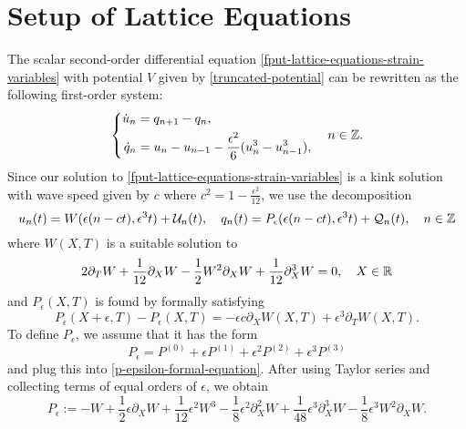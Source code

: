 \section{Setup of Lattice Equations}

The scalar second-order differential equation \cref{fput-lattice-equations-strain-variables} with potential \(V\) given by \cref{truncated-potential} can be rewritten as the following first-order system:
\begin{equation}\label{first-order-lattice-eqns}
	\left\{\begin{aligned}\dot u _n &= q_{n+1} - q_n, \\
	\dot q_n &= u_n - u_{n-1} - \frac{\epsilon^2} 6 ( u_n^3 - u^3_{n-1}),\end{aligned} \right. \quad n \in \mathbb{Z}.
\end{equation}
Since our solution to \cref{fput-lattice-equations-strain-variables} is a kink solution with wave speed given by \(c\) where \(c^2 = 1- \frac{\epsilon^2}{12}\), we use the decomposition 
\begin{equation}\label{lattice-decompositions}
	u_n(t) = W(\epsilon(n-ct), \epsilon^3t) + \mathcal U_n(t), \quad q_n(t) = P_\epsilon(\epsilon(n-ct), \epsilon^3t) + \mathcal Q_n(t), \quad n \in \mathbb{Z}
\end{equation}
where \(W(X,T)\) is a suitable solution to 
\begin{equation}\label{modulating-eqn-defocusing-mkdv}
	2\partial_T W + \frac 1 {12} \partial_X W - \frac 12 W^2 \partial_X W + \frac 1 {12} \partial_X^3 W = 0, \quad X\in \mathbb{R}
\end{equation}
and \(P_\epsilon(X,T)\) is found by formally satisfying 
\begin{equation}\label{p-epsilon-formal-equation}
	P_\epsilon(X+\epsilon, T) - P_\epsilon(X,T) = - \epsilon c \partial_X W(X,T) + \epsilon^3 \partial_T W(X,T).
\end{equation}
To define \(P_\epsilon\), we assume that it has the form
\begin{equation}
	P_\epsilon = P^{(0)} + \epsilon P^{(1)} + \epsilon^2 P^{(2)} + \epsilon^3 P^{(3)}
\end{equation}
and plug this into \cref{p-epsilon-formal-equation}. After using Taylor series and collecting terms of equal orders of \(\epsilon\), we obtain 
\begin{equation}\label{p-epsilon-definition}
	P_\epsilon := - W +  \frac  12 \epsilon\partial_X W +  \frac 1 {12} \epsilon^2 W^3  -  \frac 1 8 \epsilon^2 \partial_X^2 W +  \frac 1 {48} \epsilon^3\partial_X^3 W -  \frac 1 8 \epsilon^3 W^2 \partial_X W.
\end{equation}

